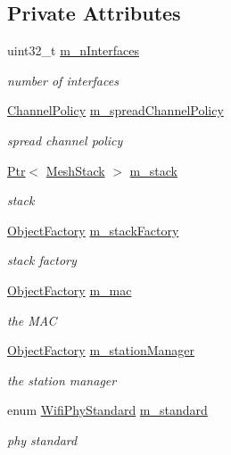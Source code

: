 \subsection*{Private Attributes}
\begin{DoxyCompactItemize}
\item 
uint32\+\_\+t \hyperlink{classns3_1_1MeshHelper_a3a64ce44422888e87991eae5342059e3}{m\+\_\+n\+Interfaces}
\begin{DoxyCompactList}\small\item\em number of interfaces \end{DoxyCompactList}\item 
\hyperlink{classns3_1_1MeshHelper_ac0e3f8f6ae16a79bb09cc25e5c7b8301}{Channel\+Policy} \hyperlink{classns3_1_1MeshHelper_a7116749ed4e2c0ab6bec633a3613bed4}{m\+\_\+spread\+Channel\+Policy}
\begin{DoxyCompactList}\small\item\em spread channel policy \end{DoxyCompactList}\item 
\hyperlink{classns3_1_1Ptr}{Ptr}$<$ \hyperlink{classns3_1_1MeshStack}{Mesh\+Stack} $>$ \hyperlink{classns3_1_1MeshHelper_a35867a1d4a69b963c79d7c2148341967}{m\+\_\+stack}
\begin{DoxyCompactList}\small\item\em stack \end{DoxyCompactList}\item 
\hyperlink{classns3_1_1ObjectFactory}{Object\+Factory} \hyperlink{classns3_1_1MeshHelper_a1a8557b965cfd2d7ffbad2948f4d05ab}{m\+\_\+stack\+Factory}
\begin{DoxyCompactList}\small\item\em stack factory \end{DoxyCompactList}\item 
\hyperlink{classns3_1_1ObjectFactory}{Object\+Factory} \hyperlink{classns3_1_1MeshHelper_a686e0cc8739ef3c0891849fd1c912a74}{m\+\_\+mac}
\begin{DoxyCompactList}\small\item\em the M\+AC \end{DoxyCompactList}\item 
\hyperlink{classns3_1_1ObjectFactory}{Object\+Factory} \hyperlink{classns3_1_1MeshHelper_a453a84d2cc5cbe9780273b247cae5190}{m\+\_\+station\+Manager}
\begin{DoxyCompactList}\small\item\em the station manager \end{DoxyCompactList}\item 
enum \hyperlink{group__wifi_ga1299834f4e1c615af3ca738033b76a49}{Wifi\+Phy\+Standard} \hyperlink{classns3_1_1MeshHelper_a9bd5a76c7e1154f5d6aabc05323256d6}{m\+\_\+standard}
\begin{DoxyCompactList}\small\item\em phy standard \end{DoxyCompactList}\end{DoxyCompactItemize}


